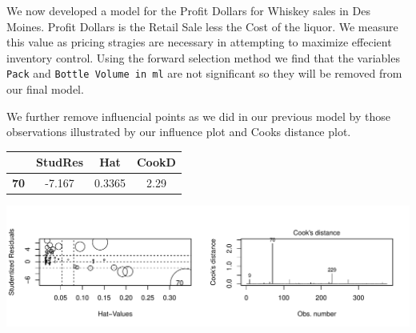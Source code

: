 \documentclass[]{elsarticle} %
\makeatletter
\def\maxwidth{\ifdim\Gin@nat@width>\linewidth\linewidth
\else\Gin@nat@width\fi}
\let\Oldincludegraphics\includegraphics
\renewcommand{\includegraphics}[1]{\Oldincludegraphics[width=\maxwidth]{#1}}
\makeatother
\begin{document}
We now developed a model for the Profit Dollars for Whiskey sales in Des
Moines. Profit Dollars is the Retail Sale less the Cost of the liquor.
We measure this value as pricing stragies are necessary in attempting to
maximize effecient inventory control. Using the forward selection method
we find that the variables \texttt{Pack} and
\texttt{Bottle\ Volume\ in\ ml} are not significant so they will be
removed from our final model.

We further remove influencial points as we did in our previous model by
those observations illustrated by our influence plot and Cooks distance
plot.

\begin{longtable}[]{@{}cccc@{}}
\toprule
\begin{minipage}[b]{0.11\columnwidth}\centering\strut
~\strut
\end{minipage} & \begin{minipage}[b]{0.12\columnwidth}\centering\strut
StudRes\strut
\end{minipage} & \begin{minipage}[b]{0.09\columnwidth}\centering\strut
Hat\strut
\end{minipage} & \begin{minipage}[b]{0.09\columnwidth}\centering\strut
CookD\strut
\end{minipage}\tabularnewline
\midrule
\endhead
\begin{minipage}[t]{0.11\columnwidth}\centering\strut
\textbf{70}\strut
\end{minipage} & \begin{minipage}[t]{0.12\columnwidth}\centering\strut
-7.167\strut
\end{minipage} & \begin{minipage}[t]{0.09\columnwidth}\centering\strut
0.3365\strut
\end{minipage} & \begin{minipage}[t]{0.09\columnwidth}\centering\strut
2.29\strut
\end{minipage}\tabularnewline
\bottomrule
\end{longtable}

\includegraphics{Final_Project_files/figure-latex/unnamed-chunk-18-1.pdf}
\end{document}
